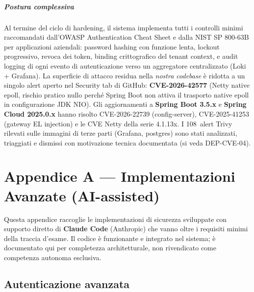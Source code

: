 ﻿\documentclass[a4paper,12pt]{report}
\begin{document}
\paragraph{Postura complessiva}
Al termine del ciclo di hardening, il sistema implementa tutti i controlli
minimi raccomandati dall'OWASP Authentication Cheat Sheet e dalla NIST SP 800-63B
per applicazioni aziendali: password hashing con funzione lenta, lockout
progressivo, revoca dei token, binding crittografico del tenant context, e
audit logging di ogni evento di autenticazione verso un aggregatore centralizzato
(Loki + Grafana). La superficie di attacco residua nella \emph{nostra codebase}
è ridotta a un singolo alert aperto nel Security tab di GitHub:
\textbf{CVE-2026-42577} (Netty native epoll, rischio pratico nullo perché
Spring Boot non attiva il trasporto native epoll in configurazione JDK NIO).
Gli aggiornamenti a \textbf{Spring Boot 3.5.x} e \textbf{Spring Cloud 2025.0.x}
hanno risolto CVE-2026-22739 (config-server), CVE-2025-41253 (gateway EL
injection) e le CVE Netty della serie 4.1.13x. I 108~alert Trivy rilevati
sulle immagini di terze parti (Grafana, postgres) sono stati analizzati,
triaggiati e dismissi con motivazione tecnica documentata (si veda DEP-CVE-04).

\appendix

\chapter{Appendice A --- Implementazioni Avanzate (AI-assisted)}
\label{app:enterprise}

Questa appendice raccoglie le implementazioni di sicurezza sviluppate con supporto
diretto di \textbf{Claude Code} (Anthropic) che vanno oltre i requisiti minimi
della traccia d'esame. Il codice è funzionante e integrato nel sistema; è documentato
qui per completezza architetturale, non rivendicato come competenza autonoma esclusiva.

\section{Autenticazione avanzata}
\end{document}
